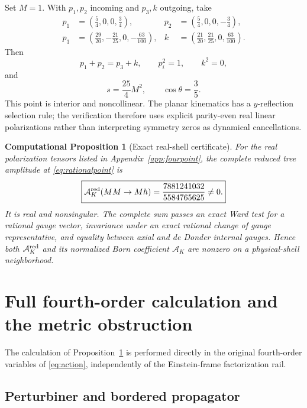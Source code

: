 \documentclass[11pt]{article}
\newtheorem{cproposition}[theorem]{Computational Proposition}
\theoremstyle{definition}
\theoremstyle{remark}
\newcommand{\AK}{\mathcal A_K}
\newcommand{\AKred}{\mathcal A_K^{\rm red}}
\begin{document}
Set $M=1$.  With $p_1,p_2$ incoming and $p_3,k$ outgoing, take
\begin{align}\label{eq:rationalpoint}
p_1&=\left(\frac54,0,0,\frac34\right),
&p_2&=\left(\frac54,0,0,-\frac34\right),\nonumber\\
p_3&=\left(\frac{29}{20},-\frac{21}{25},0,-\frac{63}{100}\right),
&k&=\left(\frac{21}{20},\frac{21}{25},0,\frac{63}{100}\right).
\end{align}
Then
\begin{equation}
p_1+p_2=p_3+k,\qquad p_i^2=1,\qquad k^2=0,
\end{equation}
and
\begin{equation}
s=\frac{25}{4}M^2,
\qquad \cos\theta=\frac35.
\end{equation}
This point is interior and noncollinear.  The planar kinematics has a
$y$-reflection selection rule; the verification therefore uses explicit
parity-even real linear polarizations rather than interpreting symmetry
zeros as dynamical cancellations.

\begin{cproposition}[Exact real-shell certificate]\label{cprop:g15}
For the real polarization tensors listed in Appendix~\ref{app:fourpoint},
the complete reduced tree amplitude at \eqref{eq:rationalpoint} is
\begin{equation}\label{eq:AK}
\boxed{\AKred(MM\to Mh)=\frac{7881241032}{5584765625}\ne0.}
\end{equation}
It is real and nonsingular.  The complete sum passes an exact Ward test
for a rational gauge vector, invariance under an exact rational change of
gauge representative, and equality between axial and de Donder internal
gauges.  Hence both $\AKred$ and its normalized Born coefficient $\AK$
are nonzero on a physical-shell neighborhood.
\end{cproposition}

\section{Full fourth-order calculation and the metric obstruction}
\label{sec:full}

The calculation of Proposition~\ref{cprop:g15} is performed directly in
the original fourth-order variables of \eqref{eq:action}, independently
of the Einstein-frame factorization rail.

\subsection{Perturbiner and bordered propagator}
\end{document}
